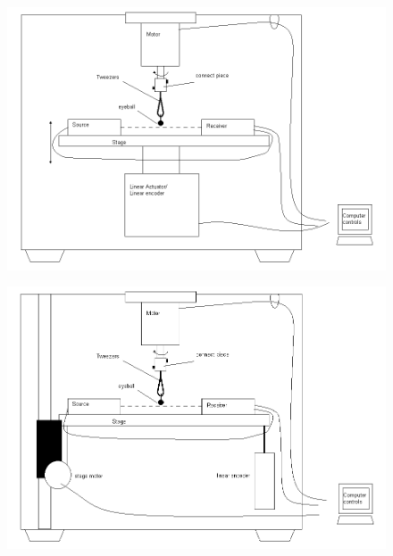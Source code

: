 \documentclass{article}
\begin{document}
\begin{figure}[p]
  \centering
  \includegraphics[width=\linewidth]{../img/schematic1}
  \label{fig:schematic1}
\end{figure}

\begin{figure}[p]
  \centering
  \includegraphics[width=\linewidth]{../img/schematic2}
  \label{fig:schematic2}
\end{figure}
\end{document}

